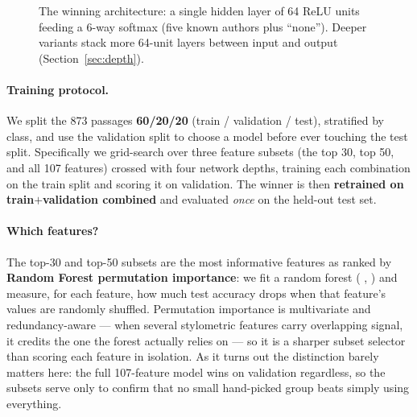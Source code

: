 \documentclass[11pt]{article}
\newcommand{\code}[1]{%
  \tcbox[on line, colback=codebg, colframe=codebg,
         boxrule=0pt, arc=2pt, left=2pt, right=2pt, top=0pt, bottom=0pt]
        {\ttfamily\small #1}}
\begin{document}
\begin{figure}[H]
\centering
{}
\caption{The winning architecture: a single hidden layer of 64 ReLU units
feeding a $6$-way softmax (five known authors plus ``none''). Deeper variants
stack more 64-unit layers between input and output (Section~\ref{sec:depth}).}
\label{fig:arch}
\end{figure}

\paragraph{Training protocol.}
We split the 873 passages \textbf{60/20/20} (train / validation / test), stratified by
class, and use the validation split to choose a model before ever touching the test
split. Specifically we grid-search over three feature subsets (the top 30, top
50, and all 107 features) crossed with four network depths, training each
combination on the train split and scoring it on validation. The winner is then
\textbf{retrained on train$+$validation combined} and evaluated \emph{once} on
the held-out test set.

\paragraph{Which features?}
The top-30 and top-50 subsets are the most informative features as ranked by
\textbf{Random Forest permutation importance}: we fit a random forest
(\code{n\_estimators=500}, \code{max\_depth=5}) and measure, for each feature,
how much test accuracy drops when that feature's values are randomly shuffled.
Permutation importance is multivariate and redundancy-aware --- when several
stylometric features carry overlapping signal, it credits the one the forest
actually relies on --- so it is a sharper subset selector than scoring each
feature in isolation. As it turns out the distinction barely matters here: the
full 107-feature model wins on validation regardless, so the subsets serve only
to confirm that no small hand-picked group beats simply using everything.
\end{document}
